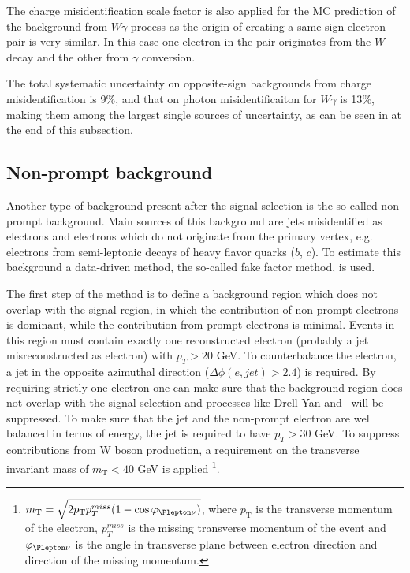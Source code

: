 The charge misidentification scale factor is also applied for the MC prediction of the background from $W\gamma$ process
as the origin of creating a same-sign electron pair is very similar.
In this case one electron in the pair originates from the $W$ decay and the other from $\gamma$ conversion.

The total systematic uncertainty on opposite-sign backgrounds from charge misidentification is 9$\%$, and that on photon misidentificaiton for $W\gamma$ is 13$\%$, making them among the largest single sources of uncertainty, as can be seen in  at the end of this subsection.

\subsection{Non-prompt background}
\label{subsec:fakes_description}

Another type of background present after the signal selection is the so-called non-prompt background.
Main sources of this background are jets misidentified as electrons and electrons which do not originate from 
the primary vertex, e.g. electrons from semi-leptonic decays of heavy flavor quarks ($b$, $c$).
To estimate this background a data-driven method, the so-called fake factor method, is used.

The first step of the method is to define a background region which does not overlap with the signal region, in which the
contribution of non-prompt electrons is dominant, while the contribution from prompt electrons is minimal.
Events in this region must contain exactly one reconstructed electron (probably a jet misreconstructed as electron) with $p_T > 20$ GeV.
To counterbalance the electron, a jet in the opposite azimuthal direction ($\Delta \phi (e,jet) > 2.4$) is required.
By requiring strictly one electron one can make sure that the background region does not overlap with the signal selection and processes 
like Drell-Yan and \ttbar~will be suppressed.
To make sure that the jet and the non-prompt electron are well balanced in terms of energy, the jet is
required to have $p_T > 30$ GeV.
To suppress contributions from W boson production, a requirement on the transverse invariant mass of 
$m_\mathrm{T} < 40$ GeV is applied
\footnote{$m_\mathrm{T} = \sqrt{2 p_\mathrm{T} p_T^{miss} (1-\cos\varphi_{\Plepton\nu})}$, where
$p_\mathrm{T}$ is the transverse momentum of the electron, $p_T^{miss}$ is the missing transverse momentum of the event
and $\varphi_{\Plepton\nu}$ is the angle in transverse plane between electron direction and direction of the missing momentum.}.

